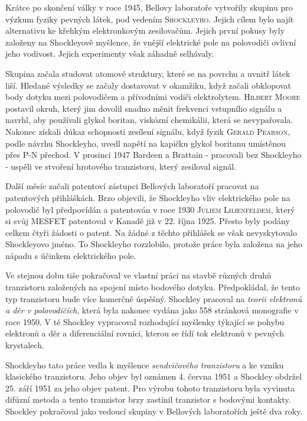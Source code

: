     \begin{tcnote}
      \small
      Krátce po skončení války v roce 1945, Bellovy laboratoře vytvořily skupinu pro výzkum fyziky
      pevných látek, pod vedením \textsc{Shockleyho}. Jejich cílem bylo najít alternativu ke křehkým
      elektronkovým zesilovačům. Jejich první pokusy byly založeny na Shockleyově myšlence, že
      vnější elektrické pole na polovodiči ovlivní jeho vodivost. Jejich experimenty však záhadně
      selhávaly.

      Skupina začala studovat atomové struktury, které se na povrchu a uvnitř látek liší. Hledané
      výsledky se začaly dostavovat v okamžiku, když začali obklopovat body dotyku mezi polovodičem
      a přívodními vodiči elektrolytem. \textsc{Hilbert Moore} postavil okruh, který jim dovolil
      snadno měnit frekvenci vstupního signálu a navrhl, aby používali glykol boritan, viskózní
      chemikálii, která se nevypařovala. Nakonec získali důkaz schopnosti zesílení signálu, když
      fyzik \textsc{Gerald Pearson}, podle návrhu Shockleyho, uvedl napětí na kapičku glykol
      boritanu umístěnou přes \textsc{P-N} přechod. V prosinci 1947 Bardeen a Brattain - pracovali
      bez Shockleyho - uspěli ve stvoření hrotového tranzistoru, který zesiloval signál.

      Další měsíc začali patentoví zástupci Bellových laboratoří pracovat na patentových
      přihláškách. Brzo objevili, že Shockleyho vliv elektrického pole na polovodič byl předpovídán
      a patentován v roce 1930 \textsc{Juliem Lilienfeldem}, který si svůj \textsc{MESFET}
      patentoval v Kanadě již v 22. října 1925. Přesto byly podány celkem čtyři žádosti o patent. Na
      žádné z těchto přihlášek se však nevyskytovalo Shockleyovo jméno. To Shockleyho rozzlobilo,
      protože práce byla založena na jeho nápadu s účinkem elektrického pole. 
      
      Ve stejnou dobu tiše pokračoval ve vlastní práci na stavbě různých druhů tranzistoru
      založených na spojení místo bodového dotyku. Předpokládal, že tento typ tranzistoru bude více
      komerčně úspěšný. Shockley pracoval na \emph{teorii elektronů a děr v polovodičích}, která
      byla nakonec vydána jako 558 stránková monografie v roce 1950. V té Shockley vypracoval
      rozhodující myšlenky týkající se pohybu elektronů a děr a diferenciální rovnici, kterou se
      řídí tok elektronů v pevných krystalech.

      Shockleyho tato práce vedla k myšlence \emph{sendvičového tranzistoru} a ke vzniku klasického
      tranzistoru. Jeho objev byl oznámen 4. června 1951 a Shockley obdržel 25. září 1951 za jeho
      objev patent. Pro výrobu tohoto tranzistoru byla vyvinuta difúzní metoda a tento tranzistor
      brzy zastínil tranzistor s bodovými kontakty. Shockley pokračoval jako vedoucí skupiny v
      Bellových laboratořích ještě dva roky.


\end{tcnote}
